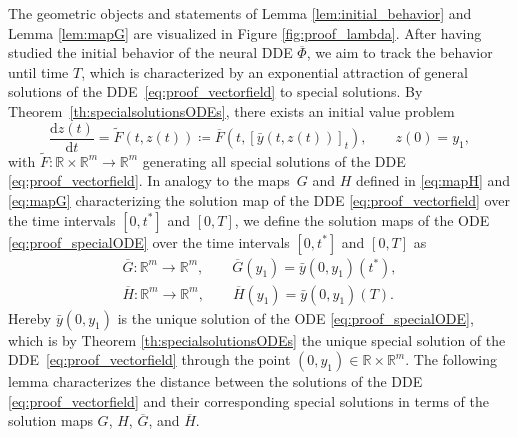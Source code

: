 \documentclass[10pt]{article}
\numberwithin{equation}{section}
\newcommand*{\dd}{\mathrm{d}}
\begin{document}
	
	The geometric objects and statements of Lemma \ref{lem:initial_behavior} and Lemma \ref{lem:mapG} are visualized in Figure \ref{fig:proof_lambda}. After having studied the initial behavior of the neural DDE $\overline{\Phi}$, we aim to track the behavior until time $T$, which is characterized by an exponential attraction of general solutions of the DDE~\eqref{eq:proof_vectorfield} to special solutions. By Theorem~\ref{th:specialsolutionsODEs}, there exists an initial value problem
	\begin{equation} \label{eq:proof_specialODE}
		\frac{\dd z(t)}{\dd t} = \widetilde{F}(t,z(t)) \coloneqq \overline{F}(t,[\bar{y}(t,z(t))]_t), \qquad z(0) = y_1,
	\end{equation}
	with $\widetilde{F}:\mathbb{R}\times \mathbb{R}^m\rightarrow \mathbb{R}^m$ generating all special solutions of the DDE \eqref{eq:proof_vectorfield}. In analogy to the maps~$G$ and $H$ defined in \eqref{eq:mapH} and \eqref{eq:mapG} characterizing the solution map of the DDE \eqref{eq:proof_vectorfield} over the time intervals $[0,t^\ast]$ and $[0,T]$, we define the solution maps of the ODE \eqref{eq:proof_specialODE} over the time intervals $[0,t^\ast]$ and $[0,T]$ as 
	\begin{align} \label{eq:mapGbar}
		\overline{G}:  \mathbb{R}^m \rightarrow \mathbb{R}^m,
		\qquad \overline{G}(y_1) =\bar{y}(0,y_1)(t^\ast),  \\
		\label{eq:mapHbar} \overline{H}:  \mathbb{R}^m \rightarrow \mathbb{R}^m,
		\qquad \overline{H}(y_1) =\bar{y}(0,y_1)(T).
	\end{align}
	Hereby $\bar{y}(0,y_1)$ is the unique solution of the ODE \eqref{eq:proof_specialODE}, which is by Theorem \ref{th:specialsolutionsODEs}  the unique special solution of the DDE~\eqref{eq:proof_vectorfield} through the point $(0,y_1)\in\mathbb{R}\times \mathbb{R}^m$. The following lemma characterizes the distance between the solutions of the DDE \eqref{eq:proof_vectorfield} and their corresponding special solutions in terms of the solution maps $G$, $H$, $\overline{G}$, and $\overline{H}$.
	
\end{document}
